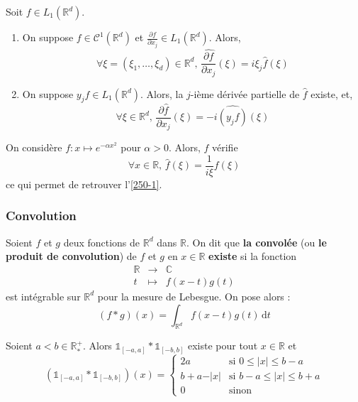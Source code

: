  \begin{proposition}
    Soit $f \in L_1(\mathbb{R}^d)$.
    \begin{enumerate}[label=(\roman*)]
      \item On suppose $f \in \mathcal{C}^1(\mathbb{R}^d)$ et $\frac{\partial f}{\partial x_j} \in L_1(\mathbb{R}^d)$. Alors,
      \[ \forall \xi = (\xi_1, \dots, \xi_d) \in \mathbb{R}^d, \, \widehat{\frac{\partial f}{\partial x_j}}(\xi) = i \xi_j \widehat{f}(\xi) \]
      \item On suppose $y_j f \in L_1(\mathbb{R}^d)$. Alors, la $j$-ième dérivée partielle de $\widehat{f}$ existe, et,
      \[ \forall \xi \in \mathbb{R}^d, \, \frac{\partial \widehat{f}}{\partial x_j}(\xi) = -i \widehat{(y_j f)}(\xi) \]
    \end{enumerate}
  \end{proposition}


  \begin{application}
    On considère $f : x \mapsto e^{- \alpha x^2}$ pour $\alpha > 0$. Alors, $f$ vérifie
    \[ \forall x \in \mathbb{R}, \, \widehat{f}(\xi) = \frac{1}{i \xi} f(\xi) \]
    ce qui permet de retrouver l'\cref{250-1}.
  \end{application}

  \subsubsection{Convolution}


  \begin{definition}
    Soient $f$ et $g$ deux fonctions de $\mathbb{R}^d$ dans $\mathbb{R}$. On dit que \textbf{la convolée} (ou \textbf{le produit de convolution}) de $f$ et $g$ en $x \in \mathbb{R}$ \textbf{existe} si la fonction
    \[
    \begin{array}{ccc}
      \mathbb{R} &\rightarrow& \mathbb{C} \\
      t &\mapsto& f(x-t)g(t)
    \end{array}
    \]
    est intégrable sur $\mathbb{R}^d$ pour la mesure de Lebesgue. On pose alors :
    \[ (f * g)(x) = \int_{\mathbb{R}^d} f(x-t)g(t) \, \mathrm{d}t \]
  \end{definition}

  \begin{example}
    Soient $a < b \in \mathbb{R}^+_*$. Alors $\mathbb{1}_{[-a, a]} * \mathbb{1}_{[-b,b]}$ existe pour tout $x \in \mathbb{R}$ et
    \[ \left( \mathbb{1}_{[-a, a]} * \mathbb{1}_{[-b,b]} \right)(x) =
    \begin{cases}
      2a &\text{si } 0 \leq \vert x \vert \leq b-a \\
      b+a-\vert x \vert &\text{si } b-a \leq \vert x \vert \leq b+a \\
      0 &\text{sinon}
    \end{cases}
    \]
  \end{example}


